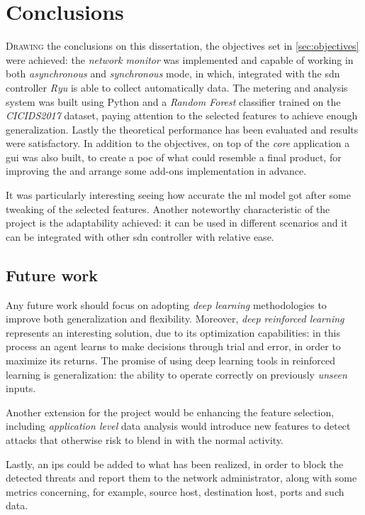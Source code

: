 \chapter{Conclusions}
\label{chap:conclusions}

\lettrine[lines=4, findent=3pt, nindent=0pt]{D}{rawing} the conclusions on this dissertation, the objectives set in \ref{sec:objectives} were achieved: the \textit{network monitor} was implemented and capable of working in both \textit{asynchronous} and \textit{synchronous} mode, in which, integrated with the \gls{sdn} controller \textit{Ryu} is able to collect automatically data. The metering and analysis system was built using Python and a \textit{Random Forest} classifier trained on the \textit{CICIDS2017} dataset, paying attention to the selected features to achieve enough generalization. Lastly the theoretical performance has been evaluated and results were satisfactory. In addition to the objectives, on top of the \textit{core} application a \gls{gui} was also built, to create a \gls{poc} of what could resemble a final product, for improving the  and arrange some add-ons implementation in advance.
\par It was particularly interesting seeing how accurate the \gls{ml} model got after some tweaking of the selected features. Another noteworthy characteristic of the project is the adaptability achieved: it can be used in different scenarios and it can be integrated with other \gls{sdn} controller with relative ease.

\section{Future work}
\label{sec:future-work}

Any future work should focus on adopting \textit{deep learning} methodologies to improve both generalization and flexibility. Moreover, \textit{deep reinforced learning} represents an interesting solution, due to its optimization capabilities: in this process an agent learns to make decisions through trial and error, in order to maximize its returns. The promise of using deep learning tools in reinforced learning is generalization:  the ability to operate correctly on previously \textit{unseen} inputs.
\par Another extension for the project would be enhancing the feature selection, including \textit{application level} data analysis would introduce new features to detect attacks that otherwise risk to blend in with the normal activity.
\par Lastly, an \gls{ips} could be added to what has been realized, in order to block the detected threats and report them to the network administrator, along with some metrics concerning, for example, source host, destination host, ports and such data.

